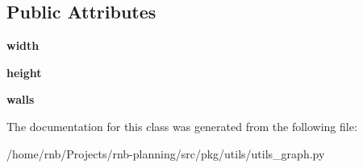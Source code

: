 \subsection*{Public Attributes}
\begin{DoxyCompactItemize}
\item 
\mbox{\label{classrnb-planning_1_1src_1_1pkg_1_1utils_1_1utils__graph_1_1_square_grid_a1b8739105c744a4e1ab92386e920e4bb}} 
{\bfseries width}
\item 
\mbox{\label{classrnb-planning_1_1src_1_1pkg_1_1utils_1_1utils__graph_1_1_square_grid_ae245fcb460dddb368e3909557ffc6721}} 
{\bfseries height}
\item 
\mbox{\label{classrnb-planning_1_1src_1_1pkg_1_1utils_1_1utils__graph_1_1_square_grid_a57cdfd98f3c21d4833070b682cec106b}} 
{\bfseries walls}
\end{DoxyCompactItemize}


The documentation for this class was generated from the following file\+:\begin{DoxyCompactItemize}
\item 
/home/rnb/\+Projects/rnb-\/planning/src/pkg/utils/utils\+\_\+graph.\+py\end{DoxyCompactItemize}
